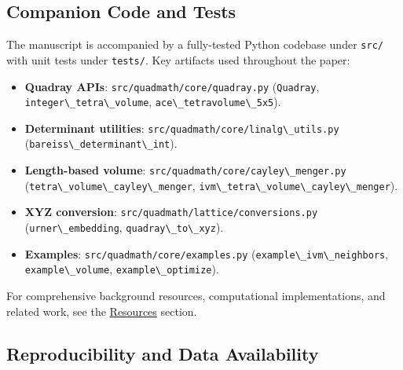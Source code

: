 \documentclass[
  10pt,
]{article}
\newcommand{\passthrough}[1]{#1}
\providecommand{\tightlist}{%
  \setlength{\itemsep}{0pt}\setlength{\parskip}{0pt}}
\begin{document}
\subsection{Companion Code and Tests}\label{companion-code-and-tests}

The manuscript is accompanied by a fully-tested Python codebase under
\passthrough{\lstinline!src/!} with unit tests under
\passthrough{\lstinline!tests/!}. Key artifacts used throughout the
paper:

\begin{itemize}
\tightlist
\item
  \textbf{Quadray APIs}:
  \passthrough{\lstinline!src/quadmath/core/quadray.py!}
  (\passthrough{\lstinline!Quadray!},
  \passthrough{\lstinline!integer\_tetra\_volume!},
  \passthrough{\lstinline!ace\_tetravolume\_5x5!}).
\item
  \textbf{Determinant utilities}:
  \passthrough{\lstinline!src/quadmath/core/linalg\_utils.py!}
  (\passthrough{\lstinline!bareiss\_determinant\_int!}).
\item
  \textbf{Length-based volume}:
  \passthrough{\lstinline!src/quadmath/core/cayley\_menger.py!}
  (\passthrough{\lstinline!tetra\_volume\_cayley\_menger!},
  \passthrough{\lstinline!ivm\_tetra\_volume\_cayley\_menger!}).
\item
  \textbf{XYZ conversion}:
  \passthrough{\lstinline!src/quadmath/lattice/conversions.py!}
  (\passthrough{\lstinline!urner\_embedding!},
  \passthrough{\lstinline!quadray\_to\_xyz!}).
\item
  \textbf{Examples}:
  \passthrough{\lstinline!src/quadmath/core/examples.py!}
  (\passthrough{\lstinline!example\_ivm\_neighbors!},
  \passthrough{\lstinline!example\_volume!},
  \passthrough{\lstinline!example\_optimize!}).
\end{itemize}

For comprehensive background resources, computational implementations,
and related work, see the \href{07_resources.md}{Resources} section.

\subsection{Reproducibility and Data
Availability}\label{reproducibility-and-data-availability}
\end{document}
